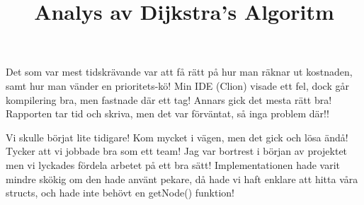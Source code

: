 \documentclass[fleqn,10pt]{article}
\begin{document}
\title{Analys av Dijkstra's Algoritm}

Det som var mest tidskrävande var att få rätt på hur man räknar ut kostnaden, samt hur man vänder en prioritets-kö!
Min IDE (Clion) visade ett fel, dock går kompilering bra, men fastnade där ett tag!
Annars gick det mesta rätt bra!
Rapporten tar tid och skriva, men det var förväntat, så inga problem där!!

Vi skulle börjat lite tidigare!
Kom mycket i vägen, men det gick och lösa ändå!
Tycker att vi jobbade bra som ett team!
Jag var bortrest i början av projektet men vi lyckades fördela arbetet på ett bra sätt!
Implementationen hade varit mindre skökig om den hade använt pekare, då hade vi haft enklare att hitta våra structs, och hade inte behövt en getNode() funktion!
\end{document}
